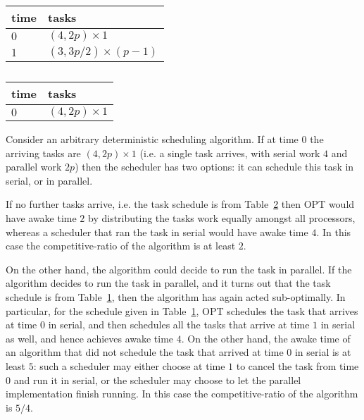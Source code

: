 \documentclass[twocolumn]{article}[10pt]
\begin{document}
\begin{table}[H]
\caption{}
\label{tab:lowerboundFork1}
\centering
\begin{tabular}{|l|l|}
\hline
time & tasks                    \\ \hline
$0$  & $(4, 2p) \times 1$       \\ \hline
$1$  & $(3, 3p/2) \times (p-1)$ \\ \hline
\end{tabular}
\end{table}

\begin{table}[H]
\caption{}
\label{tab:lowerboundFork2}
\centering
\begin{tabular}{|l|l|}
\hline
time & tasks                    \\ \hline
$0$  & $(4, 2p) \times 1$       \\ \hline
\end{tabular}
\end{table}

Consider an arbitrary deterministic scheduling algorithm. If at
time $0$ the arriving tasks are $(4, 2p)\times 1$ (i.e. a single
task arrives, with serial work $4$ and parallel work $2p$) then
the scheduler has two options: it can schedule this task in
serial, or in parallel.

If no further tasks arrive, i.e. the task schedule is from
Table~\ref{tab:lowerboundFork2} then OPT would have awake time
$2$ by distributing the tasks work equally amongst all
processors, whereas a scheduler that ran the task in serial would
have awake time $4$. In this case the competitive-ratio of the
algorithm is at least $2$.

On the other hand, the algorithm could decide to run the task in
parallel. If the algorithm decides to run the task in parallel,
and it turns out that the task schedule is from
Table~\ref{tab:lowerboundFork1}, then the algorithm has again
acted sub-optimally. In particular, for the schedule given in
Table~\ref{tab:lowerboundFork1}, OPT schedules the task that
arrives at time $0$ in serial, and then schedules all the tasks
that arrive at time $1$ in serial as well, and hence achieves
awake time $4$. On the other hand, the awake time of an algorithm
that did not schedule the task that arrived at time $0$ in
serial is at least $5$: such a scheduler may either choose at
time $1$ to cancel the task from time $0$ and run it in serial,
or the scheduler may choose to let the parallel implementation
finish running. In this case the competitive-ratio of the
algorithm is $5/4$.
\end{document}
